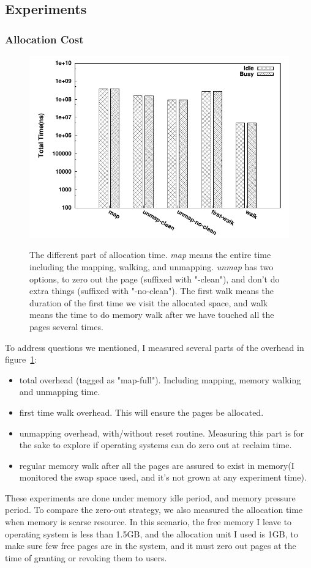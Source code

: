 \subsection{Experiments}
\subsubsection{Allocation Cost}
\begin{figure}[htpb]
\centering
\includegraphics[width=0.9\linewidth]{../figures/alloc}
\label{fig:alloc}
\caption{The different part of allocation time. \emph{map} means the entire time
including the mapping, walking, and unmapping. \emph{unmap} has two options, to
zero out the page (suffixed with "-clean"), and don't do extra things (suffixed
with "-no-clean"). The first walk means the duration of the first time we visit
the allocated space, and walk means the time to do memory walk after we have
touched all the pages several times.}
\end{figure}
To address questions we mentioned, I measured several parts of the overhead in 
figure~\ref{fig:alloc}:
\begin{itemize}
\item total overhead (tagged as "map-full"). Including mapping, memory walking
and unmapping time.
\item first time walk overhead. This will ensure the pages be allocated.
\item unmapping overhead, with/without reset routine. Measuring this part is
for the sake to explore if operating systems can do zero out at reclaim time.
\item regular memory walk after all the pages are assured to exist in memory(I
monitored the swap space used, and it's not grown at any experiment time).
\end{itemize}
These experiments are done under memory idle period, and memory pressure
period. To compare the zero-out strategy, we also measured the allocation
time when memory is scarse resource. In this scenario, the free memory I leave
to operating system is less than 1.5GB, and the allocation unit I used is
1GB, to make sure few free pages are in the system, and it must zero out pages
at the time of granting or revoking them to users.


